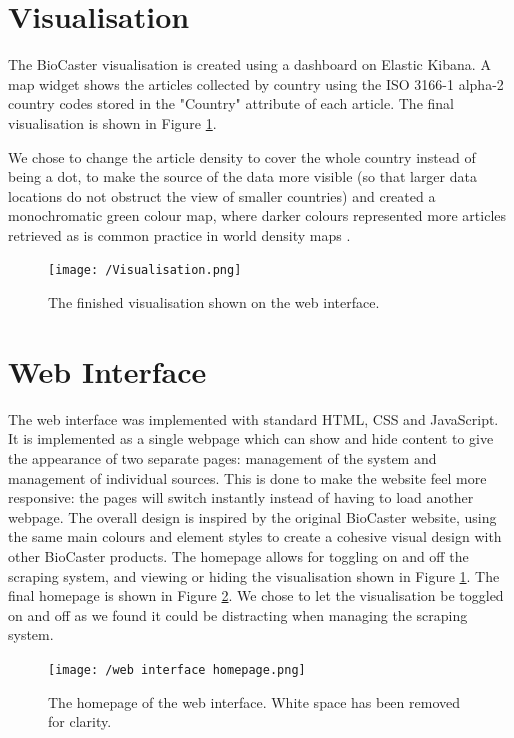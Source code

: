 \documentclass{l4proj}
\begin{document}
\section{Visualisation}
The BioCaster visualisation is created using a dashboard on Elastic Kibana. A map widget shows the articles collected by country using the ISO 3166-1 alpha-2 country codes stored in the "Country" attribute of each article. The final visualisation is shown in Figure \ref{fig:visualisation}.

We chose to change the article density to cover the whole country instead of being a dot, to make the source of the data more visible (so that larger data locations do not obstruct the view of smaller countries) and created a monochromatic green colour map, where darker colours represented more articles retrieved as is common practice in world density maps \citep{ourworldindata_density, ons_density}.

\begin{figure}[h]
\texttt{[image: /Visualisation.png]}
\caption{The finished visualisation shown on the web interface.}
\label{fig:visualisation}
\end{figure}


\section{Web Interface}
The web interface was implemented with standard HTML, CSS and JavaScript. It is implemented as a single webpage which can show and hide content to give the appearance of two separate pages: management of the system and management of individual sources. This is done to make the website feel more responsive: the pages will switch instantly instead of having to load another webpage. The overall design is inspired by the original BioCaster website, using the same main colours and element styles to create a cohesive visual design with other BioCaster products. The homepage allows for toggling on and off the scraping system, and viewing or hiding the visualisation shown in Figure \ref{fig:visualisation}. The final homepage is shown in Figure \ref{fig:web-interface-homepage}. We chose to let the visualisation be toggled on and off as we found it could be distracting when managing the scraping system.
\begin{figure}[h]
\centering
\texttt{[image: /web interface homepage.png]}
\caption{The homepage of the web interface. White space has been removed for clarity.}
\label{fig:web-interface-homepage}
\end{figure}
\end{document}
